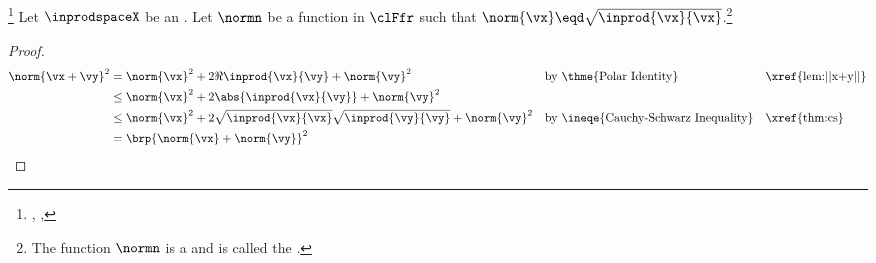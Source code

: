 \begin{theorem}
\footnote{
  ,
  ,
  }
Let $\inprodspaceX$ be an .
Let $\normn$ be a function in $\clFfr$ such that $\norm{\vx}\eqd\sqrt{\inprod{\vx}{\vx}}$.\footnote{
The function $\normn$ is a   and is called the 
.}
\thmbox{
  \norm{\vx+\vy} \le \norm{\vx}+\norm{\vy}
  \quad\sst
  \forall \vx,\vy\in\setX
  }
\end{theorem}
\begin{proof}
  \begin{align*}
    \norm{\vx+\vy}^2
      &=    \norm{\vx}^2 +2\Re{\inprod{\vx}{\vy}} + \norm{\vy}^2 
      &&    \text{by \thme{Polar Identity}} 
      &&    \text{\xref{lem:||x+y||}}
    \\&\le  \norm{\vx}^2 + 2\abs{\inprod{\vx}{\vy}} +\norm{\vy}^2
    \\&\le  \norm{\vx}^2 + 2\sqrt{\inprod{\vx}{\vx}} \sqrt{\inprod{\vy}{\vy}} + \norm{\vy}^2
      &&    \text{by \ineqe{Cauchy-Schwarz Inequality}} 
      &&    \text{\xref{thm:cs}}
    \\&=    \brp{\norm{\vx} + \norm{\vy}}^2
  \end{align*}
\end{proof}

